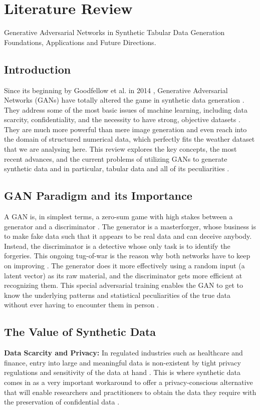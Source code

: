 \documentclass[12pt, draftclsnofoot, onecolumn]{IEEEtran}
\begin{document}
\section{Literature Review}
Generative Adversarial Networks in Synthetic Tabular Data Generation Foundations, Applications and Future Directions.

\subsection{Introduction}
Since its beginning by Goodfellow et al. in 2014 \cite{ref15}, Generative Adversarial Networks (GANs) have totally altered the game in synthetic data generation \cite{ref16,ref4}. They address some of the most basic issues of machine learning, including data scarcity, confidentiality, and the necessity to have strong, objective datasets \cite{ref6,ref14}. They are much more powerful than mere image generation and even reach into the domain of structured numerical data, which perfectly fits the weather dataset that we are analysing here. This review explores the key concepts, the most recent advances, and the current problems of utilizing GANs to generate synthetic data and in particular, tabular data and all of its peculiarities \cite{ref1}.

\subsection{GAN Paradigm and its Importance}
A GAN is, in simplest terms, a zero-sum game with high stakes between a generator and a discriminator \cite{ref15}. The generator is a masterforger, whose business is to make fake data such that it appears to be real data and can deceive anybody. Instead, the discriminator is a detective whose only task is to identify the forgeries. This ongoing tug-of-war is the reason why both networks have to keep on improving \cite{ref16}. The generator does it more effectively using a random input (a latent vector) as its raw material, and the discriminator gets more efficient at recognizing them. This special adversarial training enables the GAN to get to know the underlying patterns and statistical peculiarities of the true data without ever having to encounter them in person \cite{ref17}.

\subsection{The Value of Synthetic Data}
\textbf{Data Scarcity and Privacy:} In regulated industries such as healthcare and finance, entry into large and meaningful data is non-existent by tight privacy regulations and sensitivity of the data at hand \cite{ref2,ref3}. This is where synthetic data comes in as a very important workaround to offer a privacy-conscious alternative that will enable researchers and practitioners to obtain the data they require with the preservation of confidential data \cite{ref10}.
\end{document}
